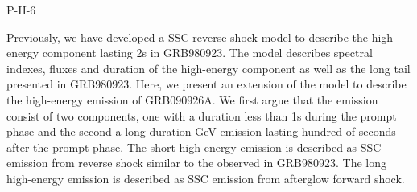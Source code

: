 P-II-6


\bigskip



\bigskip

\noindent Previously, we have developed a SSC reverse shock model to describe the high-energy component lasting 2s in GRB980923. The model describes spectral indexes, fluxes and duration of the high-energy component as well as the long tail presented in GRB980923. Here, we present an extension of the model to describe the high-energy emission of GRB090926A. We first argue that the emission consist of two components, one with a duration less than 1s during the prompt phase and the second a long duration GeV emission lasting hundred of seconds after the prompt phase. The short high-energy emission is described as SSC emission from reverse shock similar to the observed in GRB980923. The long high-energy emission is described as SSC emission from afterglow forward shock.

